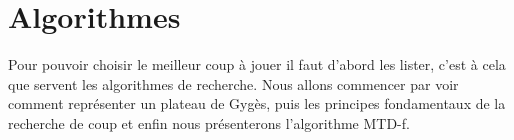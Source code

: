 \chapter{Algorithmes}

	Pour pouvoir choisir le meilleur coup à jouer il faut
	d'abord les lister, c'est à cela que servent les algorithmes
	de recherche. Nous allons commencer par voir comment représenter
	un plateau de Gygès, puis les principes fondamentaux de la recherche
	de coup et enfin nous présenterons l'algorithme MTD-f.







